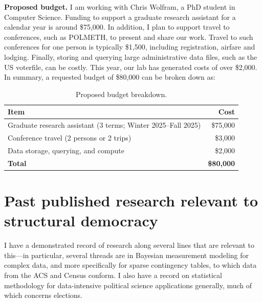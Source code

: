 \documentclass[11pt]{article}
\begin{document}
\textbf{Proposed budget.} I am working with Chris Wolfram, a PhD student in Computer Science. Funding to support a graduate research assistant for a calendar year is around \$75,000. In addition, I plan to support travel to conferences, such as POLMETH, to present and share our work. Travel to such conferences for one person is typically \$1,500, including registration, airfare and lodging. Finally, storing and querying large administrative data files, such as the US voterfile, can be costly. This year, our lab has generated costs of over \$2,000. In summary, a requested budget of \$80,000 can be broken down as:~
\begin{table}[h!]
\centering
\begin{tabular}{|l|r|}
\hline
\textbf{Item} & \textbf{Cost} \\ \hline
Graduate research assistant (3 terms; Winter 2025--Fall 2025) & \$75,000 \\ \hline
Conference travel (2 persons or 2 trips) & \$3,000 \\ \hline
Data storage, querying, and compute & \$2,000 \\ \hline
\textbf{Total} & \textbf{\$80,000} \\ \hline
\end{tabular}
\caption{Proposed budget breakdown.}
\label{tab:budget}
\end{table}
\section*{Past published research relevant to structural democracy}
I have a demonstrated record of research along several lines that are relevant to this---in particular, several threads are in Bayesian measurement modeling for complex data, and more specifically for sparse contingency tables, to which data from the ACS and Census conform. I also have a record on statistical methodology for data-intensive political science applications generally, much of which concerns elections.~
\end{document}
